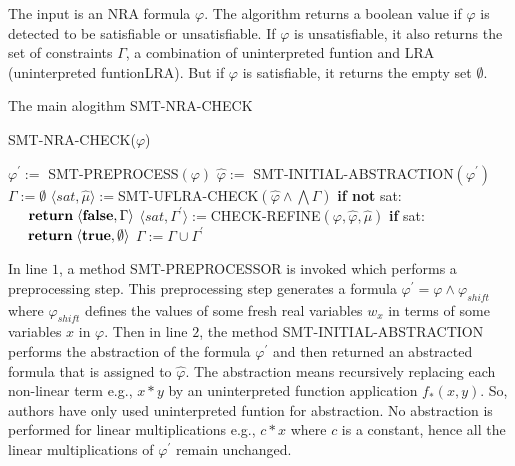 \noindent The input is an NRA formula $\varphi$.
The algorithm returns a boolean value if $\varphi$ is detected to be satisfiable or unsatisfiable.
If $\varphi$ is unsatisfiable, it also returns the set of constraints $\Gamma$, a combination of uninterpreted funtion and LRA (uninterpreted funtionLRA).
But if $\varphi$ is satisfiable, it returns the empty set $\emptyset$.\newline

\begin{algorithm}
\caption{The main alogithm SMT-NRA-CHECK \cite{Cimatti:2018:ILS:3274693.3230639}} 
\label{alg:IL_For_SMT}
SMT-NRA-CHECK($\varphi$)
\begin{algorithmic}[1]
\State $\varphi^\prime :=$ SMT-PREPROCESS$(\varphi)$
\State $\hat{\varphi} :=$ SMT-INITIAL-ABSTRACTION$(\varphi^\prime)$
\State $\Gamma := \emptyset$
\State $\langle sat, \hat{\mu} \rangle := $SMT-UFLRA-CHECK$(\hat{\varphi} \wedge \bigwedge \Gamma)$
\State \textbf{if not} sat:
\State $\hspace{5mm} \textbf{return} \hspace{1mm}\langle \textbf{false}, \Gamma \rangle$
\State $\langle sat, \Gamma^\prime \rangle := $CHECK-REFINE$(\varphi, \hat{\varphi}, \hat{\mu})$
\State \textbf{if} sat:
\State $\hspace{5mm} \textbf{return} \hspace{1mm}\langle \textbf{true}, \emptyset \rangle$
\State $\Gamma := \Gamma \cup \Gamma^\prime$
\EndWhile
\end{algorithmic}
\end{algorithm}

\noindent In line $1$, a method SMT-PREPROCESSOR is invoked which performs a preprocessing step.
This preprocessing step generates  a formula $\varphi^{\prime} = \varphi \wedge \varphi_{shift}$ where $\varphi_{shift}$ defines the values of some fresh real variables $w_{x}$ in terms of some variables $x$ in $\varphi$.
Then in line $2$, the method SMT-INITIAL-ABSTRACTION performs the abstraction of the formula $\varphi^{\prime}$ and then returned an abstracted formula that is assigned to $\hat{\varphi}$.
The abstraction means recursively replacing each non-linear term e.g., $x \ast y$ by an uninterpreted function application $f_{\ast}(x, y)$.
So, authors have only used uninterpreted funtion for abstraction.
No abstraction is performed for linear multiplications e.g., $c \ast x$ where $c$ is a constant, hence all the linear multiplications of $\varphi^{\prime}$ remain unchanged.\newline

